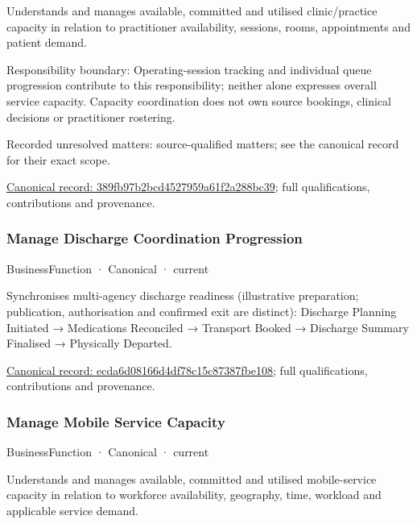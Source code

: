 Understands and manages available, committed and utilised clinic/practice capacity in relation to practitioner availability, sessions, rooms, appointments and patient demand.



Responsibility boundary: Operating-session tracking and individual queue progression contribute to this responsibility; neither alone expresses overall service capacity. Capacity coordination does not own source bookings, clinical decisions or practitioner rostering.


{\small Recorded unresolved matters: source-qualified matters; see the canonical record for their exact scope.}\par
{\footnotesize \href{../../../../continuum/business/business-function/389fb97b2bcd4527959a61f2a288bc39.md}{Canonical record: 389fb97b2bcd4527959a61f2a288bc39}; full qualifications, contributions and provenance.}\par
\subsubsection{Manage Discharge Coordination Progression}

\label{element:ecda6d08166d4df78c15c87387fbe108}
{\small BusinessFunction · Canonical · current}\par

Synchronises multi-agency discharge readiness (illustrative preparation; publication, authorisation and confirmed exit are distinct): Discharge Planning Initiated → Medications Reconciled → Transport Booked → Discharge Summary Finalised → Physically Departed.


{\footnotesize \href{../../../../continuum/business/business-function/ecda6d08166d4df78c15c87387fbe108.md}{Canonical record: ecda6d08166d4df78c15c87387fbe108}; full qualifications, contributions and provenance.}\par
\subsubsection{Manage Mobile Service Capacity}

\label{element:ad5cb5451ef645acb55ceb0c942ea013}
{\small BusinessFunction · Canonical · current}\par

Understands and manages available, committed and utilised mobile-service capacity in relation to workforce availability, geography, time, workload and applicable service demand.



